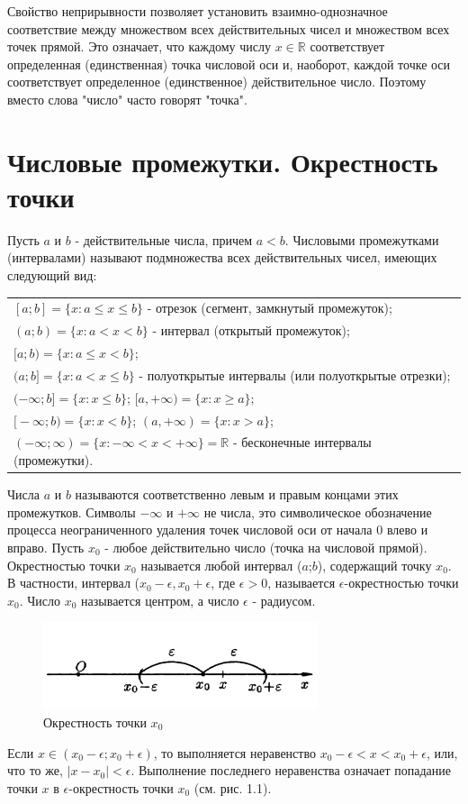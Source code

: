 \documentclass[14pt]{extreport}
\begin{document}
Свойство неприрывности позволяет установить взаимно-однозначное соответствие между множеством всех действительных чисел и множеством всех точек прямой. Это означает, что каждому числу $x \in \mathbb{R}$ соответствует определенная (единственная) точка числовой оси и, наоборот, каждой точке оси соответствует определенное (единственное) действительное число. Поэтому вместо слова "число" часто говорят "точка".

\section{Числовые промежутки. Окрестность точки}
Пусть $a$ и $b$ - действительные числа, причем $a<b$.
Числовыми промежутками (интервалами) называют подмножества всех действительных чисел, имеющих следующий вид:

\begin{center}
\begin{tabular}{l}
 $[{a};{b}]=\{{x}:{a} \leqslant {x} \leqslant {b} \}$ - отрезок (сегмент, замкнутый промежуток); \\
 $({a};{b})=\{{x}:{a}<{x}<{b}\}$ - интервал (открытый промежуток); \\
 $\text{[}{a};{b})=\{{x}:{a} \leqslant {x}<{b}\}$; \\
 $({a};{b}\text{]}=\{{x}:{a}<{x} \leqslant {b}\}$ - полуоткрытые интервалы (или полуоткрытые отрезки); \\
 $(-\infty;{b}\text{]}=\{{x}:{x} \leqslant {b}\}$;  $\text{[}{a}, +\infty)=\{{x}:{x} \geqslant {a}\}$; \\
 $\text{[}-\infty;{b})=\{{x}:{x}<{b}\}$;  $({a},+\infty)=\{{x}:{x}>a\}$; \\
 $(-\infty;\infty)=\{{x}:-\infty<x<+\infty\}=\mathbb {R}$ - бесконечные интервалы (промежутки). \\
\end{tabular}
\end{center}

Числа $a$ и $b$ называются соответственно левым и правым концами этих промежутков. Символы $-\infty$ и $+\infty$ не числа, это символическое обозначение процесса неограниченного удаления точек числовой оси от начала 0 влево и вправо.
Пусть $x_0$ - любое действительно число (точка на числовой прямой). Окрестностью точки $x_0$ называется любой интервал ($a$;$b$), содержащий точку $x_0$. В частности, интервал ($x_0-\epsilon, x_0+\epsilon$, где $\epsilon>0$, называется $\epsilon$-окрестностью точки $x_0$. Число $x_0$ называется центром, а число $\epsilon$ - радиусом.
\begin{figure}[H]
	\centerline{\includegraphics[width=0.5\linewidth]{Окрестность.png}}
	\caption{Окрестность точки $x_0$}
	\label{Окрестность}
\end{figure}
Если $x \in (x_0-\epsilon; x_0+\epsilon)$, то выполняется неравенство $x_0-\epsilon<x<x_0+\epsilon$, или, что то же, $|x-x_0|<\epsilon$. Выполнение последнего неравенства означает попадание точки $x$ в $\epsilon$-окрестность точки $x_0$ (см. рис. 1.1).
\end{document}
